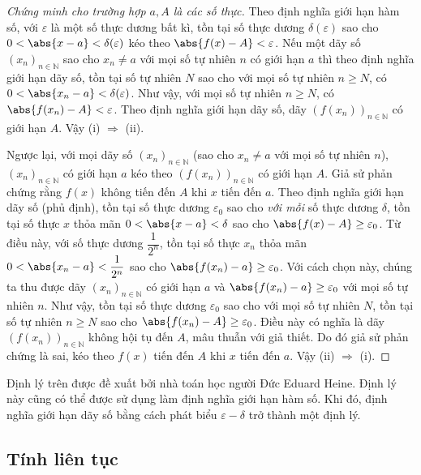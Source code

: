\begin{proof}[Chứng minh cho trường hợp $a, A$ là các số thực]
    Theo định nghĩa giới hạn hàm số, với $\varepsilon$ là một số thực dương bất kì, tồn tại số thực dương $\delta(\varepsilon)$ sao cho $0 < \abs{x - a} < \delta(\varepsilon)$ kéo theo $\abs{f(x) - A} < \varepsilon$. Nếu một dãy số ${(x_{n})}_{n\in\mathbb{N}}$ sao cho $x_{n}\ne a$ với mọi số tự nhiên $n$ có giới hạn $a$ thì theo định nghĩa giới hạn dãy số, tồn tại số tự nhiên $N$ sao cho với mọi số tự nhiên $n\geq N$, có $0 < \abs{x_{n} - a} < \delta(\varepsilon)$. Như vậy, với mọi số tự nhiên $n\geq N$, có $\abs{f(x_{n}) - A} < \varepsilon$. Theo định nghĩa giới hạn dãy số, dãy ${(f(x_{n}))}_{n\in\mathbb{N}}$ có giới hạn $A$. Vậy (i) $\Rightarrow$ (ii).

    Ngược lại, với mọi dãy số ${(x_{n})}_{n\in\mathbb{N}}$ (sao cho $x_{n}\ne a$ với mọi số tự nhiên $n$), ${(x_{n})}_{n\in\mathbb{N}}$ có giới hạn $a$ kéo theo ${(f(x_{n}))}_{n\in\mathbb{N}}$ có giới hạn $A$. Giả sử phản chứng rằng $f(x)$ không tiến đến $A$ khi $x$ tiến đến $a$. Theo định nghĩa giới hạn dãy số (phủ định), tồn tại số thực dương $\varepsilon_{0}$ sao cho \textit{với mỗi} số thực dương $\delta$, tồn tại số thực $x$ thỏa mãn $0 < \abs{x - a} < \delta$ sao cho $\abs{f(x) - A}\geq \varepsilon_{0}$. Từ điều này, với số thực dương $\dfrac{1}{2^{n}}$, tồn tại số thực $x_{n}$ thỏa mãn $0 < \abs{x_{n} - a} < \dfrac{1}{2^{n}}$ sao cho $\abs{f(x_{n}) - a}\geq \varepsilon_{0}$. Với cách chọn này, chúng ta thu được dãy ${(x_{n})}_{n\in\mathbb{N}}$ có giới hạn $a$ và $\abs{f(x_{n}) - a}\geq \varepsilon_{0}$ với mọi số tự nhiên $n$. Như vậy, tồn tại số thực dương $\varepsilon_{0}$ sao cho với mọi số tự nhiên $N$, tồn tại số tự nhiên $n\geq N$ sao cho $\abs{f(x_{n}) - A}\geq \varepsilon_{0}$. Điều này có nghĩa là dãy ${(f(x_{n}))}_{n\in\mathbb{N}}$ không hội tụ đến $A$, mâu thuẫn với giả thiết. Do đó giả sử phản chứng là sai, kéo theo $f(x)$ tiến đến $A$ khi $x$ tiến đến $a$. Vậy (ii) $\Rightarrow$ (i).
\end{proof}

Định lý trên được đề xuất bởi nhà toán học người Đức Eduard Heine. Định lý này cũng có thể được sử dụng làm định nghĩa giới hạn hàm số. Khi đó, định nghĩa giới hạn dãy số bằng cách phát biểu $\varepsilon - \delta$ trở thành một định lý.

\subsection{Tính liên tục}

